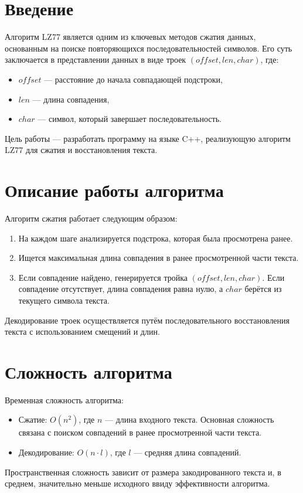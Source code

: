 \section*{Введение}
Алгоритм LZ77 является одним из ключевых методов сжатия данных, основанным на поиске повторяющихся последовательностей символов. Его суть заключается в представлении данных в виде троек $(o\!ffset, len, char)$, где:
\begin{itemize}
    \item $o\!ffset$ — расстояние до начала совпадающей подстроки,
    \item $len$ — длина совпадения,
    \item $char$ — символ, который завершает последовательность.
\end{itemize}
Цель работы — разработать программу на языке C++, реализующую алгоритм LZ77 для сжатия и восстановления текста.

\section*{Описание работы алгоритма}
Алгоритм сжатия работает следующим образом:
\begin{enumerate}
    \item На каждом шаге анализируется подстрока, которая была просмотрена ранее.
    \item Ищется максимальная длина совпадения в ранее просмотренной части текста.
    \item Если совпадение найдено, генерируется тройка $(o\!ffset, len, char)$. Если совпадение отсутствует, длина совпадения равна нулю, а $char$ берётся из текущего символа текста.
\end{enumerate}

Декодирование троек осуществляется путём последовательного восстановления текста с использованием смещений и длин.

\section*{Сложность алгоритма}
Временная сложность алгоритма:
\begin{itemize}
    \item Сжатие: $O(n^2)$, где $n$ — длина входного текста. Основная сложность связана с поиском совпадений в ранее просмотренной части текста.
    \item Декодирование: $O(n \cdot l)$, где $l$ — средняя длина совпадений.
\end{itemize}
Пространственная сложность зависит от размера закодированного текста и, в среднем, значительно меньше исходного ввиду эффективности алгоритма.

